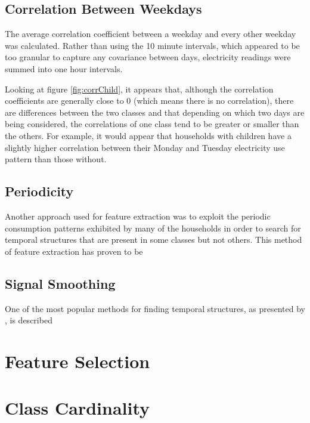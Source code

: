 \logADVChild
\logADVSocio

\subsection*{Correlation Between Weekdays}

The average correlation coefficient between a weekday and every other weekday was calculated. Rather than using the 10 minute intervals, which appeared to be too granular to capture any covariance between days, electricity readings were summed into one hour intervals.


\corrChild

Looking at figure \ref{fig:corrChild}, it appears that, although the correlation coefficients are generally close to 0 (which means there is no correlation), there are differences between the two classes and that depending on which two days are being considered, the correlations of one class tend to be greater or smaller than the others. For example, it would appear that households with children have a slightly higher correlation between their Monday and Tuesday electricity use pattern than those without.

\corrSocio 


\subsection{Periodicity}

Another approach used for feature extraction was to exploit the periodic consumption patterns exhibited by many of the households in order to search for temporal structures that are present in some classes but not others. This method of feature extraction has proven to be 


\subsection{Signal Smoothing}



\cite{Nixon}

One of the most popular methods for finding temporal structures, as presented by \cite{Moerchen}, is described 
		

\section{Feature Selection}

\section{Class Cardinality}
